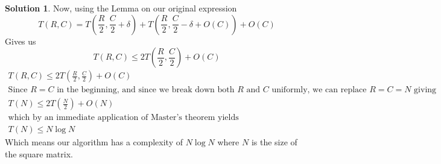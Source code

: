 \documentclass{article}
\theoremstyle{definition}
\newtheorem*{solution}{Solution}
\begin{document}
\begin{solution}
Now, using the Lemma on our original expression
$$
T(R, C) = T\left(\frac{R}{2}, \frac{C}{2} + \delta\right) + T\left(\frac{R}{2}, \frac{C}{2} - \delta + O(C) \right) + O(C)
$$
Gives us
$$
T(R, C) \leq 2 T \left(\frac{R}{2}, \frac{C}{2} \right) + O(C)
$$
\begin{gather*}
T(R, C) \leq 2 T \left(\frac{R}{2}, \frac{C}{2} \right) + O(C) \\
\text{Since $R = C$ in the beginning, and since we break down both $R$ and $C$ uniformly, we can replace $R = C = N$ giving} \\
T(N) \leq  2 T \left( \frac{N}{2} \right) + O(N) \\
\text{which by an immediate application of Master's theorem yields} \\
T(N) \leq N \log N
\end{gather*}
Which means our algorithm has a complexity of $N \log N$ where $N$ is the size of the square matrix.
\end{solution}
\end{document}
